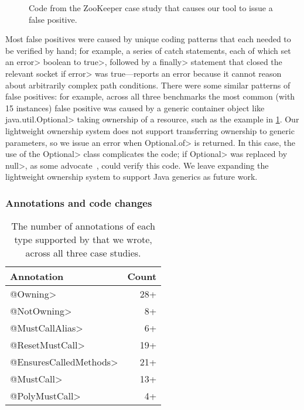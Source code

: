 \begin{figure}
  
  \caption{Code from the ZooKeeper case study that causes our tool
  to issue a false positive.}
  \label{fig:zookeeper-optional}
\end{figure}

Most false positives were caused by unique coding patterns that
each needed to be verified by hand; for example, a series of catch
statements, each of which set an \<error> boolean to \<true>, followed
by a \<finally> statement that closed the relevant socket if \<error>
was true---\Tool reports an error because it cannot reason about arbitrarily
complex path conditions. There were some similar patterns of false positives:
for example, across all three benchmarks the most common (with 15 instances) false
positive was caused by
a generic container object like \<java.util.Optional> taking ownership of a resource, such
as the example in \cref{fig:zookeeper-optional}. Our lightweight ownership
system does not support transferring ownership to generic parameters,
so we issue an error when \<Optional.of> is returned. In this case, the use
of the \<Optional> class complicates the code; if \<Optional> was replaced
by \<null>, as some advocate~\cite{ErnstNothingIsBetterThanOptional},
\Tool could verify this code. We leave expanding the lightweight ownership system to
support Java generics as future work.

\subsubsection{Annotations and code changes}
\label{sec:annos}

\begin{table}
  \caption{The number of annotations of each
    type supported by \Tool that we wrote, across all
    three case studies.}
  \label{tab:annos}
  \begin{tabularx}{\columnwidth}{@{}Xr@{}}
    Annotation          &      Count     \\
    \hline
    \<@Owning>          &      28+      \\
    \<@NotOwning>       &      8+       \\
    \<@MustCallAlias>   &      6+       \\
    \<@ResetMustCall>   &      19+      \\
    \<@EnsuresCalledMethods> & 21+      \\
    \<@MustCall>        &      13+      \\
    \<@PolyMustCall>    &      4+       \\
  \end{tabularx}
\end{table}

